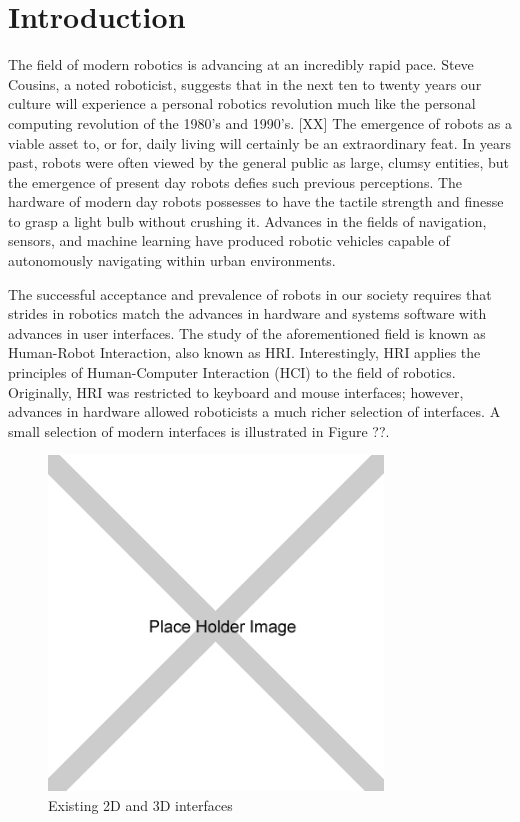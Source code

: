 \chapter{Introduction}

The field of modern robotics is advancing at an incredibly rapid pace. Steve Cousins, a noted roboticist, suggests that in the next ten to twenty years our culture will experience a personal robotics revolution much like the personal computing revolution of the 1980's and 1990's. [XX] The emergence of robots as a viable asset to, or for, daily living will certainly be an extraordinary feat. In years past, robots were often viewed by the general public as large, clumsy entities, but the emergence of present day robots defies such previous perceptions. The hardware of modern day robots possesses to have the tactile strength and finesse to grasp a light bulb without crushing it. Advances in the fields of navigation, sensors, and machine learning have produced robotic vehicles capable of autonomously navigating within urban environments.

The successful acceptance and prevalence of robots in our society requires that strides in robotics match the advances in hardware and systems software with advances in user interfaces. The study of the aforementioned field is known as Human-Robot Interaction, also known as HRI. Interestingly, HRI applies the principles of Human-Computer Interaction (HCI) to the field of robotics. Originally, HRI was restricted to keyboard and mouse interfaces; however, advances in hardware allowed roboticists a much richer selection of interfaces. A small selection of modern interfaces is illustrated in Figure ??.

\begin{figure}[ht]
\begin{center}
\includegraphics[width=3.5in]{images/placeholder.png}
\caption{Existing 2D and 3D interfaces\label{fig:existing-robot-ui}}
\end{center}
\end{figure}

